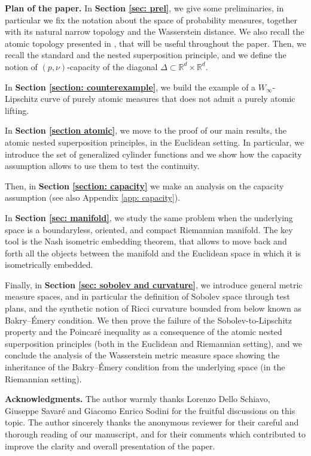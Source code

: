 \documentclass[10pt,leqno]{amsart}
\numberwithin{equation}{section}
\newcommand{\R}{\mathbb{R}}
\begin{document}
\bigskip

\textbf{Plan of the paper.} In \textbf{Section \ref{sec: prel}}, we give some preliminaries, in particular we fix the notation about the space of probability measures, together with its natural narrow topology and the Wasserstein distance. We also recall the atomic topology presented in \cite{ethier1994convergence}, that will be useful throughout the paper. Then, we recall the standard and the nested superposition principle, and we define the notion of $(p,\nu)$-capacity of the diagonal $\Delta\subset \R^d\times \R^d$. 

In \textbf{Section \ref{section: counterexample}}, we build the example of a $W_\infty$-Lipschitz curve of purely atomic measures that does not admit a purely atomic lifting. 

In \textbf{Section \ref{section atomic}}, we move to the proof of our main results, the atomic nested superposition principles, in the Euclidean setting. In particular, we introduce the set of generalized cylinder functions and we show how the capacity assumption allows to use them to test the continuity. 

Then, in \textbf{Section \ref{section: capacity}} we make an analysis on the capacity assumption (see also Appendix \ref{app: capacity}).

In \textbf{Section \ref{sec: manifold}}, we study the same problem when the underlying space is a boundaryless, oriented, and compact Riemannian manifold. The key tool is the Nash isometric embedding theorem, that allows to move back and forth all the objects between the manifold and the Euclidean space in which it is isometrically embedded. 

Finally, in \textbf{Section \ref{sec: sobolev and curvature}}, we introduce general metric measure spaces, and in particular the definition of Sobolev space through test plans, and the synthetic notion of Ricci curvature bounded from below known as Bakry--\'Emery condition. We then prove the failure of the Sobolev-to-Lipschitz property and the Poincar\'e inequality as a consequence of the atomic nested superposition principles (both in the Euclidean and Riemannian setting), and we conclude the analysis of the Wasserstein metric measure space showing the inheritance of the Bakry--\'Emery condition from the underlying space (in the Riemannian setting).

\bigskip

\noindent \textbf{Acknowledgments.} The author warmly thanks Lorenzo Dello Schiavo, Giuseppe Savar\'e and Giacomo Enrico Sodini for the fruitful discussions on this topic. The author sincerely thanks the anonymous reviewer for their careful and thorough reading of our manuscript, and for their comments which contributed to improve the clarity and overall presentation of the paper.
\bigskip
\end{document}
